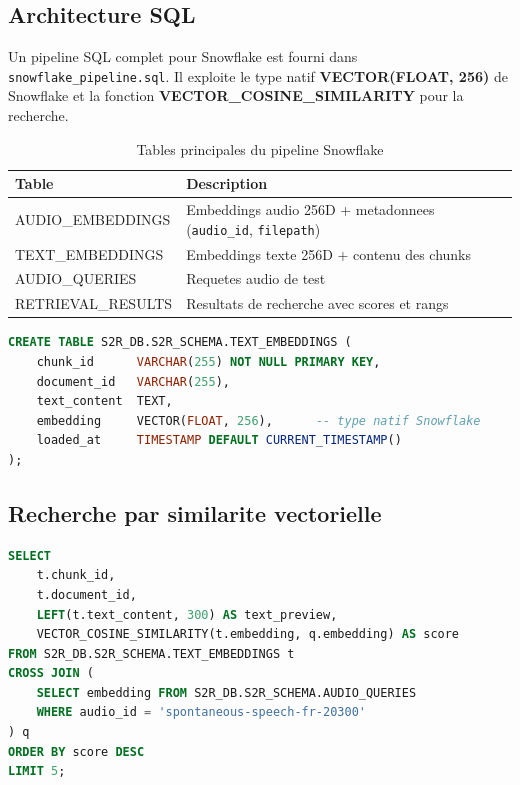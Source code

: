 \documentclass[12pt, a4paper]{article}
\begin{document}
\subsection{Architecture SQL}

Un pipeline SQL complet pour Snowflake est fourni dans \texttt{snowflake\_pipeline.sql}.
Il exploite le type natif \textbf{VECTOR(FLOAT, 256)} de Snowflake
et la fonction \textbf{VECTOR\_COSINE\_SIMILARITY} pour la recherche.

\begin{table}[H]
\centering
\caption{Tables principales du pipeline Snowflake}
\begin{tabularx}{\linewidth}{>{\ttfamily}l X}
\toprule
\textbf{Table} & \textbf{Description} \\
\midrule
AUDIO\_EMBEDDINGS   & Embeddings audio 256D + metadonnees (\texttt{audio\_id}, \texttt{filepath}) \\
\rowcolor{silver}
TEXT\_EMBEDDINGS    & Embeddings texte 256D + contenu des chunks \\
AUDIO\_QUERIES      & Requetes audio de test \\
\rowcolor{silver}
RETRIEVAL\_RESULTS  & Resultats de recherche avec scores et rangs \\
\bottomrule
\end{tabularx}
\end{table}

\begin{lstlisting}[language=SQL, caption={Schema de la table TEXT\_EMBEDDINGS dans Snowflake}]
CREATE TABLE S2R_DB.S2R_SCHEMA.TEXT_EMBEDDINGS (
    chunk_id      VARCHAR(255) NOT NULL PRIMARY KEY,
    document_id   VARCHAR(255),
    text_content  TEXT,
    embedding     VECTOR(FLOAT, 256),      -- type natif Snowflake
    loaded_at     TIMESTAMP DEFAULT CURRENT_TIMESTAMP()
);
\end{lstlisting}

\subsection{Recherche par similarite vectorielle}

\begin{lstlisting}[language=SQL, caption={Recherche top-5 dans Snowflake}]
SELECT
    t.chunk_id,
    t.document_id,
    LEFT(t.text_content, 300) AS text_preview,
    VECTOR_COSINE_SIMILARITY(t.embedding, q.embedding) AS score
FROM S2R_DB.S2R_SCHEMA.TEXT_EMBEDDINGS t
CROSS JOIN (
    SELECT embedding FROM S2R_DB.S2R_SCHEMA.AUDIO_QUERIES
    WHERE audio_id = 'spontaneous-speech-fr-20300'
) q
ORDER BY score DESC
LIMIT 5;
\end{lstlisting}
\end{document}
